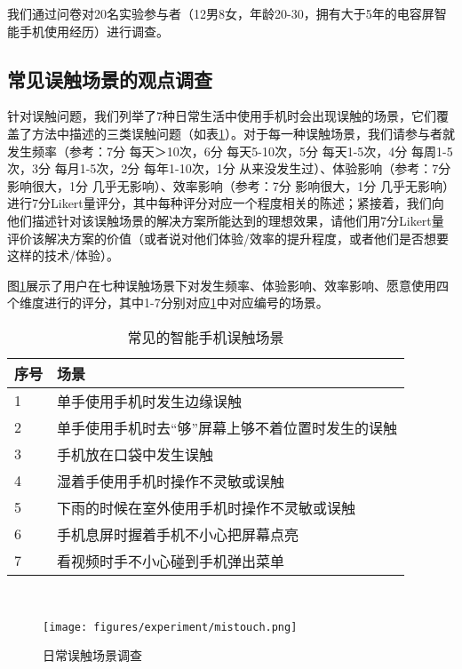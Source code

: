 我们通过问卷对20名实验参与者（12男8女，年龄20-30，拥有大于5年的电容屏智能手机使用经历）进行调查。

\subsection{常见误触场景的观点调查}

针对误触问题，我们列举了7种日常生活中使用手机时会出现误触的场景，它们覆盖了方法中描述的三类误触问题（如表\ref{MistouchTable}）。对于每一种误触场景，我们请参与者就发生频率（参考：7分 每天＞10次，6分 每天5-10次，5分 每天1-5次，4分 每周1-5次，3分 每月1-5次，2分 每年1-10次，1分 从来没发生过）、体验影响（参考：7分 影响很大，1分 几乎无影响）、效率影响（参考：7分 影响很大，1分 几乎无影响）进行7分Likert量评分，其中每种评分对应一个程度相关的陈述；紧接着，我们向他们描述针对该误触场景的解决方案所能达到的理想效果，请他们用7分Likert量评价该解决方案的价值（或者说对他们体验/效率的提升程度，或者他们是否想要这样的技术/体验）。

图\ref{fig:mistouch}展示了用户在七种误触场景下对发生频率、体验影响、效率影响、愿意使用四个维度进行的评分，其中1-7分别对应\ref{MistouchTable}中对应编号的场景。

\begin{table}[htbp]

\centering
\caption{常见的智能手机误触场景}
\label{MistouchTable}
\begin{tabular}{p{40 pt}p{280 pt}}
 \toprule
序号 & 场景 \\
 \midrule
1 & 单手使用手机时发生边缘误触 \\
2 & 单手使用手机时去“够”屏幕上够不着位置时发生的误触 \\
3 & 手机放在口袋中发生误触 \\
4 & 湿着手使用手机时操作不灵敏或误触 \\
5 & 下雨的时候在室外使用手机时操作不灵敏或误触 \\
6 & 手机息屏时握着手机不小心把屏幕点亮 \\
7 & 看视频时手不小心碰到手机弹出菜单 \\
\bottomrule
 \end{tabular}\\[2pt]
\end{table}

\begin{figure}[h]
  \centering
  \texttt{[image: figures/experiment/mistouch.png]}
  \caption{日常误触场景调查}
  \label{fig:mistouch}
\end{figure}

